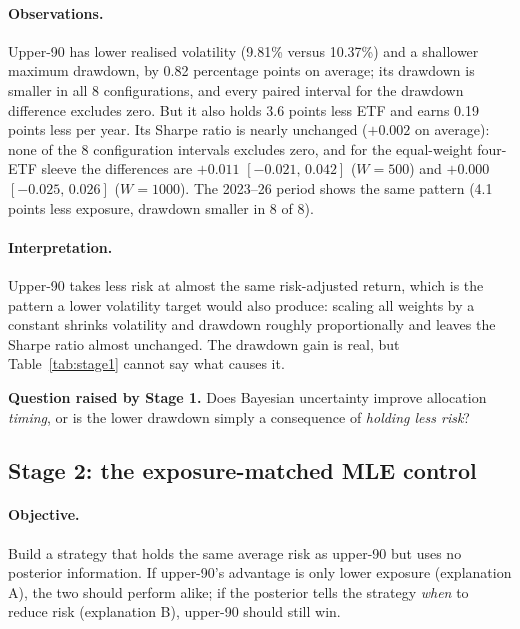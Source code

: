 \documentclass[11pt]{article}
\newcommand{\keybox}[1]{\par\smallskip\noindent\colorbox{boxbg}{\parbox{\dimexpr\textwidth-2\fboxsep}{#1}}\par\smallskip}
\begin{document}
\paragraph{Observations.} Upper-90 has lower realised volatility (9.81\% versus 10.37\%) and a shallower maximum
drawdown, by 0.82 percentage points on average; its drawdown is smaller in all 8 configurations, and every paired
interval for the drawdown difference excludes zero. But it also holds 3.6 points less ETF and earns 0.19 points less
per year. Its Sharpe ratio is nearly unchanged ($+0.002$ on average): none of the 8 configuration intervals excludes
zero, and for the equal-weight four-ETF sleeve the differences are $+0.011$ $[-0.021,\,0.042]$ ($W=500$) and $+0.000$
$[-0.025,\,0.026]$ ($W=1000$). The 2023--26 period shows the same pattern (4.1 points less exposure, drawdown smaller in
8 of 8).

\paragraph{Interpretation.} Upper-90 takes less risk at almost the same risk-adjusted return, which is the pattern a
lower volatility target would also produce: scaling all weights by a constant shrinks volatility and drawdown roughly
proportionally and leaves the Sharpe ratio almost unchanged. The drawdown gain is real, but Table~\ref{tab:stage1}
cannot say what causes it.

\keybox{\textbf{Question raised by Stage 1.} Does Bayesian uncertainty improve allocation \emph{timing}, or is the lower
drawdown simply a consequence of \emph{holding less risk}?}

\subsection{Stage 2: the exposure-matched MLE control}\label{sec:stage2}
\paragraph{Objective.} Build a strategy that holds the same average risk as upper-90 but uses no posterior
information. If upper-90's advantage is only lower exposure (explanation A), the two should perform alike; if the
posterior tells the strategy \emph{when} to reduce risk (explanation B), upper-90 should still win.
\end{document}
